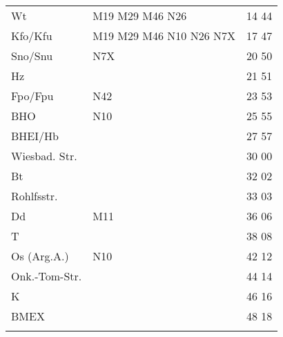 \begin{tabular}{!{\color{schiefergrau}\vrule width 3pt}*{3}{l!{\color{schiefergrau}\vrule width 3pt}}}
\hline
{}
 \\
\hline
Wt           & \nueins{} \nuzwei{} \mbus{} M19 M29 M46 \nbus{} N26                   & 14 44 \\
Kfo/Kfu      & \nueins{} \nuzwei{} \nuneun{} \mbus{} M19 M29 M46 \nbus{} N10 N26 N7X & 17 47 \\
Sno/Snu      & \nuneun{} \nbus{} N7X                                                 & 20 50 \\
Hz           &                                                                       & 21 51 \\
Fpo/Fpu      & \nusieben{} \nbus{} N42                                               & 23 53 \\
BHO          & \nbus{} N10                                                           & 25 55 \\
BHEI/Hb      &                                                                       & 27 57 \\
Wiesbad. Str.&                                                                       & 30 00 \\
Bt           &                                                                       & 32 02 \\
Rohlfsstr.   &                                                                       & 33 03 \\
Dd           & \mbus{} M11                                                           & 36 06 \\
T            &                                                                       & 38 08 \\
Os (Arg.A.)  & \nbus{} N10                                                           & 42 12 \\
Onk.-Tom-Str.&                                                                       & 44 14 \\
K            &                                                                       & 46 16 \\
BMEX         &                                                                       & 48 18 \\
\myhline
\end{tabular}
%
